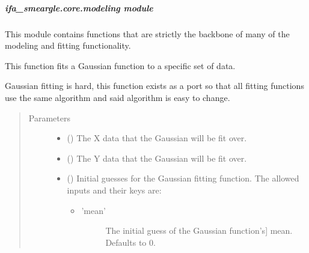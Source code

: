 \documentclass[letterpaper,10pt,english]{sphinxmanual}
\begin{document}
\subparagraph{ifa\_smeargle.core.modeling module}
\label{\detokenize{docstrings/ifa_smeargle.core.modeling:module-ifa_smeargle.core.modeling}}\label{\detokenize{docstrings/ifa_smeargle.core.modeling:ifa-smeargle-core-modeling-module}}\label{\detokenize{docstrings/ifa_smeargle.core.modeling::doc}}
This module contains functions that are strictly the backbone of many
of the modeling and fitting functionality.

\begin{fulllineitems}
\label{\detokenize{docstrings/ifa_smeargle.core.modeling:ifa_smeargle.core.modeling.fit_gaussian_function}}
This function fits a Gaussian function to a specific set of
data.

Gaussian fitting is hard, this function exists as a port so that
all fitting functions use the same algorithm and said algorithm
is easy to change.
\begin{quote}\begin{description}
\item[{Parameters}] \leavevmode\begin{itemize}
\item {} 
 () \textendash{} The X data that the Gaussian will be fit over.

\item {} 
 () \textendash{} The Y data that the Gaussian will be fit over.

\item {} 
 () \textendash{} 
Initial guesses for the Gaussian fitting function. The
allowed inputs and their keys are:
\begin{itemize}
\item {} \begin{description}
\item[{’mean’}] \leavevmode{[}The initial guess of the Gaussian function’s{]}
mean. Defaults to 0.


\end{description}
\end{itemize}
\end{itemize}
\end{description}
\end{quote}
\end{fulllineitems}
\end{document}
